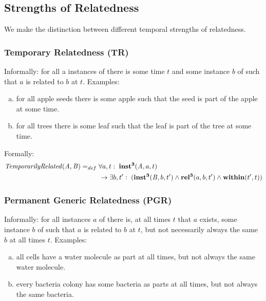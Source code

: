 \subsection*{Strengths of Relatedness}

We make the distinction between different temporal strengths of relatedness.

\subsubsection{Temporary Relatedness (TR)}

Informally: for all a instances of  there is some time $t$ and some instance $b$ of
 such that $a$ is related to $b$ at $t$. Examples:
\begin{enumerate}[(a)]
\item for all apple seeds there is
some apple such that the seed is part of the apple at some time.
\item for all
trees there is some leaf such that the leaf is part of the tree at some time.
\end{enumerate}

Formally:
\begin{equation}
\begin{split}
\mathit{TemporarilyRelated}(\mathit{A},\mathit{B}) =_{def}&\;
\forall a, t:\; \mathrm{\mathbf{inst^3}}(\mathit{A}, a, t) \\
&\ \rightarrow
\exists b, t^\prime:\;(\mathrm{\mathbf{inst^3}}(\mathit{B},b,t^\prime) \wedge
\mathrm{\mathbf{rel^3}}(a,b,t^\prime) \wedge \mathrm{\mathbf{within}}(t^\prime,t))
\end{split}
\label{eq:temporarily:cls}
\end{equation}

\subsubsection{Permanent Generic Relatedness (PGR)}

Informally: for all instances $a$ of  there is, at all times $t$ that
$a$ exists,
some instance $b$ of  such that $a$ is related to $b$ at $t$, but not necessarily
always the same $b$ at all times $t$. Examples:
\begin{enumerate}[(a)]
\item all cells have a water molecule as
part at all times, but not always the same water molecule.
\item every bacteria colony has some bacteria as parts at all times, but not
always the same bacteria.
\end{enumerate}


